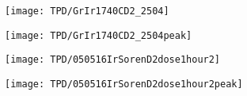 \begin{figure}[H]
  \centering 
  \begin{subfigure}[b]{0.45\textwidth}
    \texttt{[image: TPD/GrIr1740CD2\_2504]}
    \caption{}
    \label{TPD:example}
  \end{subfigure}
  \begin{subfigure}[b]{0.45\textwidth}
    \texttt{[image: TPD/GrIr1740CD2\_2504peak]}
    \caption{}
    \label{TPD:peak}
  \end{subfigure}
  \caption{}
  \label{TPD:win}
\end{figure}


\begin{figure}[H]
  \centering
  \begin{subfigure}[b]{0.45\textwidth}
    \texttt{[image: TPD/050516IrSorenD2dose1hour2]}
    \caption{}
    \label{TPD:example2}
  \end{subfigure}
  \begin{subfigure}[b]{0.45\textwidth}
    \texttt{[image: TPD/050516IrSorenD2dose1hour2peak]}
    \caption{}
    \label{TPD:peak2}
  \end{subfigure}
  \caption{}
  \label{TPD:fail}
\end{figure}
